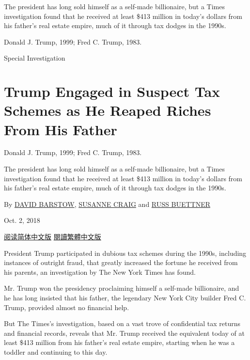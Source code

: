 The president has long sold himself as a self-made billionaire, but a
Times investigation found that he received at least \$413 million in
today's dollars from his father's real estate empire, much of it through
tax dodges in the 1990s.

Donald J. Trump, 1999; Fred C. Trump, 1983.

Special Investigation

\hypertarget{trump-engaged-in-suspect-tax-schemes-as-he-reaped-riches-from-his-father-1}{%
\section{Trump Engaged in Suspect Tax Schemes as He Reaped Riches From
His
Father}\label{trump-engaged-in-suspect-tax-schemes-as-he-reaped-riches-from-his-father-1}}

Donald J. Trump, 1999; Fred C. Trump, 1983.

The president has long sold himself as a self-made billionaire, but a
Times investigation found that he received at least \$413 million in
today's dollars from his father's real estate empire, much of it through
tax dodges in the 1990s.

By \href{https://www.nytimes3xbfgragh.onion/by/david-barstow}{DAVID
BARSTOW},
\href{https://www.nytimes3xbfgragh.onion/by/susanne-craig}{SUSANNE
CRAIG} and
\href{https://www.nytimes3xbfgragh.onion/by/russ-buettner}{RUSS
BUETTNER}

Oct. 2, 2018

\href{https://cn.nytimes3xbfgragh.onion/usa/20181008/tax-report/}{阅读简体中文版}
\href{https://cn.nytimes3xbfgragh.onion/usa/20181008/tax-report/zh-hant/}{閱讀繁體中文版}

President Trump participated in dubious tax schemes during the 1990s,
including instances of outright fraud, that greatly increased the
fortune he received from his parents, an investigation by The New York
Times has found.

Mr. Trump won the presidency proclaiming himself a self-made
billionaire, and he has long insisted that his father, the legendary New
York City builder Fred C. Trump, provided almost no financial help.

But The Times's investigation, based on a vast trove of confidential tax
returns and financial records, reveals that Mr. Trump received the
equivalent today of at least \$413 million from his father's real estate
empire, starting when he was a toddler and continuing to this day.

